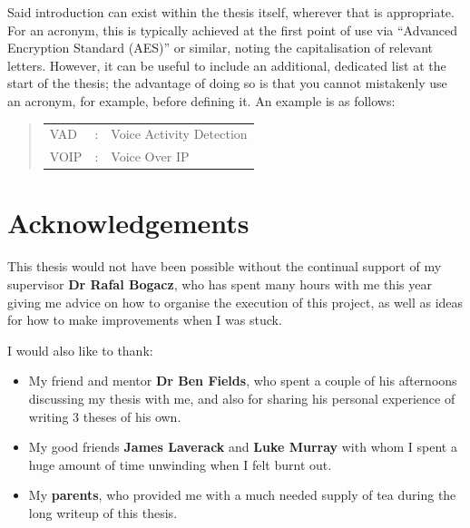 \documentclass[ %
                    author={Sam Phippen},
                supervisor={Dr. Rafal Bogacz},
                     title={Real time voice activity detectors in noisy personal computing environments},
                  subtitle={},
                    degree={MEng},
                      year={2012} ]{thesis}
\begin{document}
Said introduction can exist within the thesis itself, wherever that is
appropriate.  For an acronym, this is typically achieved at the first point 
of use via ``Advanced Encryption Standard (AES)'' or similar, noting the 
capitalisation of relevant letters.  However, it can be useful to include 
an additional, dedicated list at the start of the thesis; the advantage of 
doing so is that you cannot mistakenly use an acronym, for example, 
before defining it.  An example is as follows:

\begin{quote}
\noindent
\begin{tabular}{lcl}
VAD                 &:     & Voice Activity Detection                 \\
VOIP                &:     & Voice Over IP\\
\end{tabular}
\end{quote}


\chapter*{Acknowledgements}

\vspace{1cm}

This thesis would not have been possible without the continual support of my
supervisor {\bf Dr Rafal Bogacz}, who has spent many hours with me this year giving
me advice on how to organise the execution of this project, as well as ideas
for how to make improvements when I was stuck.

I would also like to thank:
\begin{itemize}

    \item My friend and mentor {\bf Dr Ben Fields}, who spent a couple of his
        afternoons discussing my thesis with me, and also for sharing his
        personal experience of writing 3 theses of his own.

    \item My good friends {\bf James Laverack} and {\bf Luke Murray} with whom I spent a
        huge amount of time unwinding when I felt burnt out.

    \item My {\bf parents}, who provided me with a much needed supply of tea during
        the long writeup of this thesis.

\end{itemize}
\end{document}
